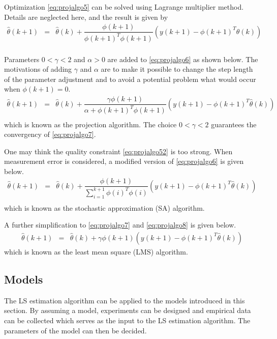 Optimization \eqref{eq:projalgo5} can be solved using Lagrange multiplier method. Details are neglected here, and the result is given by
\begin{eqnarray}
  \hat{\theta}(k+1) &=& \hat{\theta}(k) + \dfrac{\phi(k+1)}{\phi(k+1)^T\phi(k+1)}\left(y(k+1) - \phi(k+1)^T\hat{\theta}(k)\right) \nonumber \\ && \label{eq:projalgo6}
\end{eqnarray}

Parameters $0 < \gamma < 2$ and $\alpha > 0$ are added to \eqref{eq:projalgo6} as shown below. The motivations of adding $\gamma$ and $\alpha$ are to make it possible to change the step length of the parameter adjustment and to avoid a potential problem what would occur when $\phi(k+1)=0$.
\begin{eqnarray}
  \hat{\theta}(k+1) &=& \hat{\theta}(k) + \dfrac{\gamma\phi(k+1)}{\alpha + \phi(k+1)^T\phi(k+1)}\left(y(k+1) - \phi(k+1)^T\hat{\theta}(k)\right) \nonumber \\ && \label{eq:projalgo7}
\end{eqnarray}
which is known as the projection algorithm. The choice $0 < \gamma < 2$ guarantees the convergency of \eqref{eq:projalgo7}.

One may think the quality constraint \eqref{eq:projalgo52} is too strong. When measurement error is considered, a modified version of \eqref{eq:projalgo6} is given below.
\begin{eqnarray}
\hat{\theta}(k+1) &=& \hat{\theta}(k) + \dfrac{\phi(k+1)}{\sum_{i=1}^{k+1}\phi(i)^T\phi(i)}\left(y(k+1) - \phi(k+1)^T\hat{\theta}(k)\right) \nonumber \\ && \label{eq:projalgo8}
\end{eqnarray}
which is known as the stochastic approximation (SA) algorithm.

A further simplification to \eqref{eq:projalgo7} and \eqref{eq:projalgo8} is given below.
\begin{eqnarray}
\hat{\theta}(k+1) &=& \hat{\theta}(k) + \gamma\phi(k+1)\left(y(k+1) - \phi(k+1)^T\hat{\theta}(k)\right) \nonumber
\end{eqnarray}
which is known as the least mean square (LMS) algorithm.

\subsection{Models}

The LS estimation algorithm can be applied to the models introduced in this section. By assuming a model, experiments can be designed and empirical data can be collected which serves as the input to the LS estimation algorithm. The parameters of the model can then be decided.

